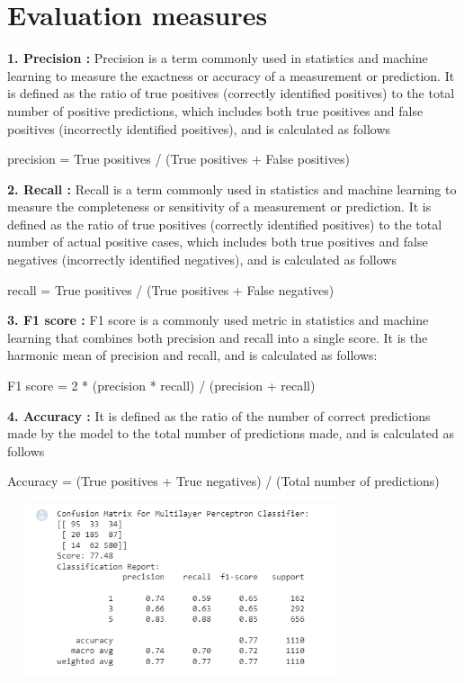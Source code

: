 \documentclass[a4paper, 12pt]{report}
\begin{document}
\section{Evaluation measures}
\textbf{1. Precision : }Precision is a term commonly used in statistics and machine learning to measure the exactness or accuracy of a measurement or prediction. It is defined as the ratio of true positives (correctly identified positives) to the total number of positive predictions, which includes both true positives and false positives (incorrectly identified positives), and is calculated as follows
\begin{center}
	precision = True positives / (True positives + False positives)
\end{center}
\textbf{2. Recall : }Recall is a term commonly used in statistics and machine learning to measure the completeness or sensitivity of a measurement or prediction. It is defined as the ratio of true positives (correctly identified positives) to the total number of actual positive cases, which includes both true positives and false negatives (incorrectly identified negatives), and is calculated as follows
\begin{center}
	recall = True positives / (True positives + False negatives)
\end{center}
\textbf{3. F1 score  : }F1 score is a commonly used metric in statistics and machine learning that combines    both precision and recall into a single score. It is the harmonic mean of precision and recall, and is calculated as follows: 
\begin{center}
	F1 score = 2 * (precision * recall) / (precision + recall)
\end{center} 
\textbf{4. Accuracy : }It is defined as the ratio of the number of correct predictions made by the model to the total number of predictions made, and is calculated as follows
\begin{center}
	Accuracy = (True positives + True negatives) / (Total number of predictions)
\end{center}
\begin{center}
	\includegraphics[height=2in,width=4in]{30}\\
\end{center}
\end{document}
